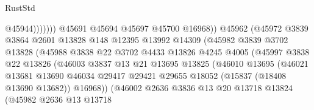 \begin{lexlean}{RustStd}
\begin{coremodule}
{\begin{coremodule}
{{{{{{{{{{{{{{{{{{{{{{{{{{{{{{{{{{{{{{{{{{{{{{{{{{{{{{{{{{{{                                              @45944)))))))
                                @45691
                                @45694
                                @45697
                                @45700
                                @16968))
                            @45962
                            (@45972
                              @3839
                              @3864
                              @2601
                              @13828
                              @148
                              @12395
                              @13992
                              @14309
                              (@45982
                                @3839
                                @3702
                                @13828
                                (@45988
                                  @3838
                                  @22
                                  @3702
                                  @4433
                                  @13826
                                  @4245
                                  @4005
                                  (@45997
                                    @3838
                                    @22
                                    @13826
                                    (@46003
                                      @3837
                                      @13
                                      @21
                                      @13695
                                      @13825
                                      (@46010
                                        @13695
                                        (@46021
                                          @13681
                                          @13690
                                          @46034
                                          @29417
                                          @29421
                                          @29655
                                          @18052
                                          (@15837 (@18408 @13690 @13682))
                                          @16968))
                                      (@46002
                                        @2636
                                        @3836
                                        @13
                                        @20
                                        @13718
                                        @13824
                                        (@45982
                                          @2636
                                          @13
                                          @13718
}}}}}}}}}}}}}}}}}}}}}}}}}}}}}}}}}}}}}}}}}}}}}}}}}}}}}}}}}}}}
\end{coremodule}}
\end{coremodule}
\end{lexlean}

